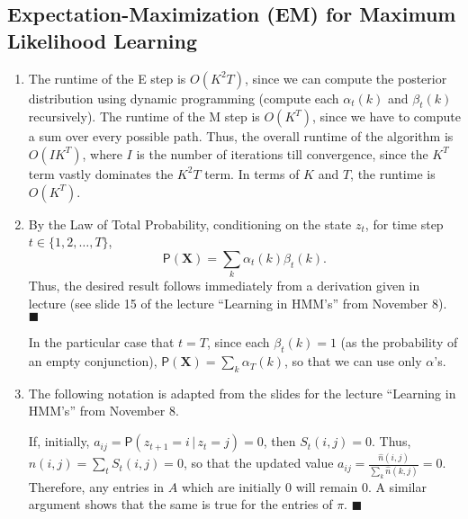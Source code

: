 \documentclass[11pt]{article}
\renewcommand{\qed}{\quad $\blacksquare$}
\newcommand{\bX}{\mathbf{X}}
\newcommand{\pr}[1]{\mathsf{P}\left( #1 \right)} %
\newcommand{\giv}{\, | \,} %
\begin{document}
\subsection{Expectation-Maximization (EM) for Maximum Likelihood Learning}
\begin{enumerate}[1.]
\item The runtime of the E step is $O(K^2T)$, since we can compute the
posterior distribution using dynamic programming (compute each $\alpha_t(k)$ 
and $\beta_t(k)$ recursively). The runtime of the M step is $O(K^T)$, since
we have to compute a sum over every possible path. Thus, the overall runtime
of the algorithm is $O(IK^T)$, where $I$ is the number of iterations till
convergence, since the $K^T$ term vastly dominates the $K^2T$ term.
In terms of $K$ and $T$, the runtime is $O(K^T)$.

\item
By the Law of Total Probability, conditioning on the state $z_t$, for time
step $t \in \{1,2,\ldots, T\}$,
\[
\pr{\bX} = \sum_k\alpha_t(k)\beta_t(k).
\]
Thus, the desired result follows immediately from a derivation given in
lecture (see slide 15 of the lecture ``Learning in HMM's'' from November 8).
\qed

In the particular case that $t = T$, since each $\beta_t(k) = 1$ (as the
probability of an empty conjunction), $\pr{\bX} = \sum_k\alpha_T(k)$, so that
we can use only $\alpha$'s.

\item The following notation is adapted from the slides for the lecture
``Learning in HMM's'' from November 8.

If, initially, $a_{ij} = \pr{z_{t + 1} = i \giv z_t = j} = 0$, then
$S_t(i,j) = 0$. Thus, $\hat{n}(i,j) = \sum_t S_t(i,j) = 0$, so that the updated
value $a_{ij} = \frac{\hat{n}(i,j)}{\sum_k \hat{n}(k,j)} = 0$. Therefore, any
entries in $A$ which are initially $0$ will remain $0$. A similar argument
shows that the same is true for the entries of $\pi$. \qed
\end{enumerate}

\newpage
\end{document}
